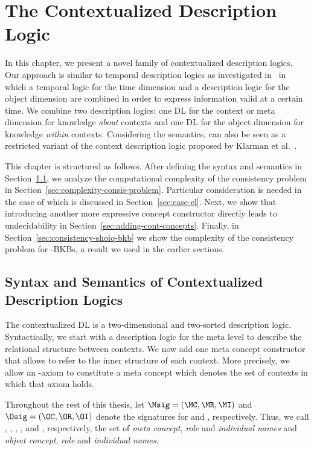 \chapter{The Contextualized Description Logic \texorpdfstring{\LMLO}{LM[LO]}}
\label{cha:context-dls}

In this chapter, we present a novel family of contextualized description logics. Our approach is
similar to temporal description logics as investigated in~\cite{LuWZ-TIME08} in which a temporal
logic for the time dimension and a description logic for the object dimension are combined in order
to express information valid at a certain time. We combine two description logics: one DL \LM for
the context or meta dimension for knowledge \emph{about} contexts and one DL \LO for the object
dimension for knowledge \emph{within} contexts.
%
Considering the semantics, \LMLO can also be seen as a restricted variant of the context description
logic proposed by Klarman et al.~\cite{KG16}.

This chapter is structured as follows. After defining the syntax and semantics in
Section~\ref{sec:syn-seman-cdl}, we analyze the computational complexity of the consistency problem
in Section~\ref{sec:complexity-consis-problem}. Particular consideration is needed in the case of
\EL which is discussed in Section~\ref{sec:case-el}. Next, we show that introducing another more
expressive concept constructor directly leads to undecidability in
Section~\ref{sec:adding-cont-concepts}.  Finally, in Section~\ref{sec:consistency-shoiq-bkb} we show
the complexity of the consistency problem for \SHOIQ-BKBs, a result we used in the earlier sections.


\section{Syntax and Semantics of Contextualized Description Logics}
\label{sec:syn-seman-cdl}

The contextualized DL \LMLO is a two-dimensional and two-sorted description logic. Syntactically, we
start with a description logic \LM for the meta level to describe the relational structure between
contexts. We now add one meta concept constructor that allows to refer to the inner structure of
each context. More precisely, we allow an \LO-axiom to constitute a meta concept which denotes the
set of contexts in which that axiom holds.

Throughout the rest of this thesis, let $\Msig = (\MC, \MR, \MI)$ and $\Osig = (\OC, \OR, \OI)$
denote the signatures for \LM and \LO, respectively. Thus, we call \MC, \MR, \MI, \OC, \OR and \OI,
respectively, the set of \emph{meta concept}, \emph{role} and \emph{individual names} and
\emph{object concept}, \emph{role} and \emph{individual names}.

